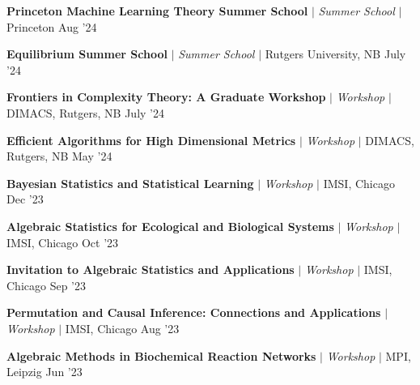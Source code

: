 
\resumeProjectHeading
{\textbf{Princeton Machine Learning Theory Summer School} $|$ \textit{\color{gray}Summer School} $|$ Princeton}
{Aug '24}
{}
\vspace{\mygap}

\resumeProjectHeading
{\textbf{Equilibrium Summer School} $|$ \textit{\color{gray}Summer School} $|$ Rutgers University, NB}
{July '24}
{}
\vspace{\mygap}

\resumeProjectHeading
{\textbf{Frontiers in Complexity Theory: A Graduate Workshop} $|$ \textit{\color{gray}Workshop} $|$ DIMACS, Rutgers, NB}
{July '24}
{}
\vspace{\mygap}

\resumeProjectHeading
{\textbf{Efficient Algorithms for High Dimensional Metrics} $|$ \textit{\color{gray}Workshop} $|$ DIMACS, Rutgers, NB}
{May '24}
{}
\vspace{\mygap}

\resumeProjectHeading
{\textbf{Bayesian Statistics and Statistical Learning} $|$ \textit{\color{gray}Workshop} $|$ IMSI, Chicago}
{Dec '23}
{}
\vspace{\mygap}

\resumeProjectHeading
{\textbf{Algebraic Statistics for Ecological and Biological Systems} $|$ \textit{\color{gray}Workshop}  $|$ IMSI, Chicago}
{Oct '23}
{}
\vspace{\mygap}


\resumeProjectHeading
{\textbf{Invitation to Algebraic Statistics and Applications} $|$ \textit{\color{gray}Workshop}  $|$ IMSI, Chicago}
{{Sep '23}}
{}
\vspace{\mygap}

\resumeProjectHeading
{\textbf{Permutation and Causal Inference: Connections and Applications} $|$ \textit{\color{gray}Workshop} $|$ IMSI, Chicago}
{{Aug '23}}
{}
\vspace{\mygap}

\resumeProjectHeading
{\textbf{Algebraic Methods in Biochemical Reaction Networks} $|$ \textit{\color{gray}Workshop}  $|$ MPI, Leipzig}
{{Jun '23}}
{}

